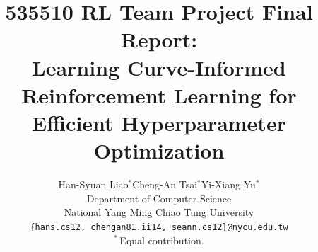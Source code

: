 \documentclass{article}
\title{535510 RL Team Project Final Report: \\ Learning Curve-Informed Reinforcement Learning for Efficient Hyperparameter Optimization}
\author{%
  Han-Syuan Liao$^{*}$\quad Cheng-An Tsai$^{*}$\quad Yi-Xiang Yu$^{*}$\\
  Department of Computer Science\\
  National Yang Ming Chiao Tung University\\
  \texttt{\{hans.cs12, chengan81.ii14, seann.cs12\}@nycu.edu.tw}\\
  \vspace{2pt}
  $^{*}$\,Equal contribution.
}
\begin{document}
\maketitle

















\newpage
{
\small


}
\end{document}
